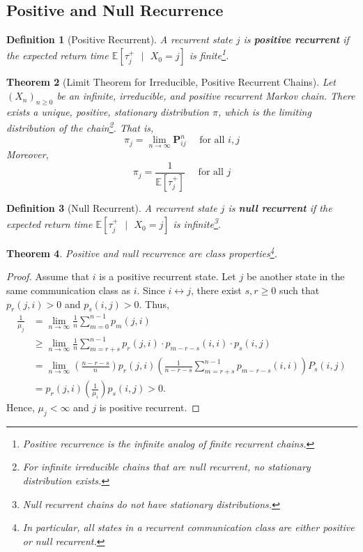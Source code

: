 \documentclass{tufte-handout}
\newtheorem{thm}{Theorem}
\newtheorem{defn}[thm]{Definition}
\begin{document}
  \subsection{Positive and Null Recurrence}
  \begin{defn}[Positive Recurrent]
    A recurrent state $j$ is \textbf{positive recurrent} if the expected return time $\mathbb{E}[\tau^+_j \text{ $|$ } X_0 = j]$ is finite\footnote{Positive recurrence is the infinite analog of finite recurrent chains.}.
  \end{defn}

  \begin{thm}[Limit Theorem for Irreducible, Positive Recurrent Chains]
    Let $(X_n)_{n \geq 0}$ be an infinite, irreducible, and positive recurrent Markov chain. There exists a unique, positive, stationary distribution $\pi$, which is the limiting distribution of the chain\footnote{For infinite irreducible chains that are null recurrent, no stationary distribution exists.}. That is,
     \[\pi_j = \lim_{n \rightarrow \infty}\boldsymbol{P}_{ij}^n \quad \text{ for all $i,j$}\]
    \noindent Moreover,
    \[\pi_j = \frac{1}{\mathbb{E}[\tau^+_j]} \quad \text{ for all $j$}\] 
  \end{thm}

  \begin{defn}[Null Recurrent]
    A recurrent state $j$ is \textbf{null recurrent} if the expected return time $\mathbb{E}[\tau^+_j \text{ $|$ } X_0 = j]$ is infinite\footnote{Null recurrent chains do not have stationary distributions.}.
  \end{defn}

  \begin{thm}
    Positive and null recurrence are class properties\footnote{In particular, all states in a recurrent communication class are either positive or null recurrent.}.
  \end{thm}

  \begin{proof}
    Assume that $i$ is a positive recurrent state. Let $j$ be another state in the same communication class as $i$. Since $i \leftrightarrow j$, there exist $s,r \geq 0$ such that $p_r(j,i) > 0$ and $p_s(i,j) > 0$. Thus,
    \begin{align*}
    \frac{1}{\mu_{j}} &=\lim _{n \rightarrow \infty} \frac{1}{n} \sum_{m=0}^{n-1} p_m(j,i) \\
    & \geq \lim _{n \rightarrow \infty} \frac{1}{n} \sum_{m=r+s}^{n-1} p_r(j,i) \cdot p_{m-r-s}(i,i) \cdot p_{s}(i,j) \\
    &=\lim _{n \rightarrow \infty}\left(\frac{n-r-s}{n}\right) p_r(j,i) \left(\frac{1}{n-r-s} \sum_{m=r+s}^{n-1} p_{m-r-s}(i,i)\right) P_{s}(i,j) \\
    &=p_r(j,i)\left(\frac{1}{\mu_{i}}\right) p_s(i,j)>0 .
    \end{align*}
    \noindent Hence, $\mu_j < \infty$ and $j$ is positive recurrent.
  \end{proof}
\end{document}
